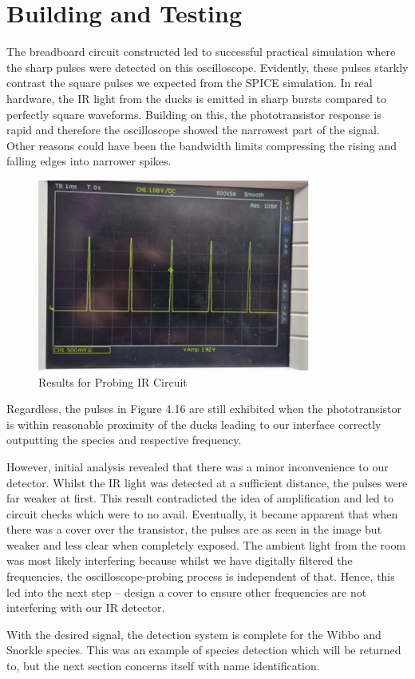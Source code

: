 \section{Building and Testing}
The breadboard circuit constructed led to successful practical simulation where the sharp pulses were detected on this oscilloscope. Evidently, these pulses starkly contrast the square pulses we expected from the SPICE simulation. In real hardware, the IR light from the ducks is emitted in sharp bursts compared to perfectly square waveforms. Building on this, the phototransistor response is rapid and therefore the oscilloscope showed the narrowest part of the signal. Other reasons could have been the bandwidth limits compressing the rising and falling edges into narrower spikes.
\begin{figure}[h]
    \centering
    \includegraphics[width=0.8\textwidth]{subpages/images/ir_probe.png}
    \caption{Results for Probing IR Circuit}
    \label{fig:ir_probe}
\end{figure}

Regardless, the pulses in Figure 4.16 are still exhibited when the phototransistor is within reasonable proximity of the ducks leading to our interface correctly outputting the species and respective frequency.

However, initial analysis revealed that there was a minor inconvenience to our detector. Whilst the IR light was detected at a sufficient distance, the pulses were far weaker at first. This result contradicted the idea of amplification and led to circuit checks which were to no avail. Eventually, it became apparent that when there was a cover over the transistor, the pulses are as seen in the image but weaker and less clear when completely exposed. The ambient light from the room was most likely interfering because whilst we have digitally filtered the frequencies, the oscilloscope-probing process is independent of that. Hence, this led into the next step – design a cover to ensure other frequencies are not interfering with our IR detector.

With the desired signal, the detection system is complete for the Wibbo and Snorkle species. This was an example of species detection which will be returned to, but the next section concerns itself with name identification.
